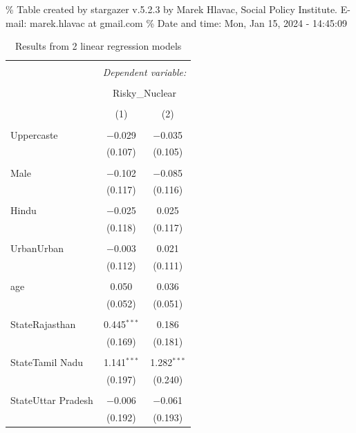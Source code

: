 \documentclass[
]{article}
\begin{document}
\begingroup\setlength{\tabcolsep}{1pt}

\renewcommand{\arraystretch}{0.7}

\% Table created by stargazer v.5.2.3 by Marek Hlavac, Social Policy
Institute. E-mail: marek.hlavac at gmail.com \% Date and time: Mon, Jan
15, 2024 - 14:45:09

\begin{table}[!htbp] \centering 
  \caption{Results from 2 linear regression models} 
  \label{} 
\begin{tabular}{@{\extracolsep{5pt}}lcc} 
\\[-1.8ex]\hline 
\hline \\[-1.8ex] 
 & \multicolumn{2}{c}{\textit{Dependent variable:}} \\ 
\cline{2-3} 
\\[-1.8ex] & \multicolumn{2}{c}{Risky\_Nuclear} \\ 
\\[-1.8ex] & (1) & (2)\\ 
\hline \\[-1.8ex] 
 Uppercaste & $-$0.029 & $-$0.035 \\ 
  & (0.107) & (0.105) \\ 
  & & \\ 
 Male & $-$0.102 & $-$0.085 \\ 
  & (0.117) & (0.116) \\ 
  & & \\ 
 Hindu & $-$0.025 & 0.025 \\ 
  & (0.118) & (0.117) \\ 
  & & \\ 
 UrbanUrban & $-$0.003 & 0.021 \\ 
  & (0.112) & (0.111) \\ 
  & & \\ 
 age & 0.050 & 0.036 \\ 
  & (0.052) & (0.051) \\ 
  & & \\ 
 StateRajasthan & 0.445$^{***}$ & 0.186 \\ 
  & (0.169) & (0.181) \\ 
  & & \\ 
 StateTamil Nadu & 1.141$^{***}$ & 1.282$^{***}$ \\ 
  & (0.197) & (0.240) \\ 
  & & \\ 
 StateUttar Pradesh & $-$0.006 & $-$0.061 \\ 
  & (0.192) & (0.193) \\ 

\end{tabular}
\end{table}
\end{document}
